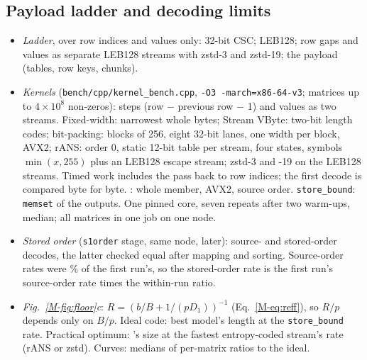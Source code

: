 \subsection{Payload ladder and decoding limits}
\label{sec:mkernels}
\begin{itemize}\itemsep 1pt
\item \emph{Ladder}, over row indices and values only: 32-bit CSC; LEB128; row gaps and values as separate LEB128 streams
  with zstd-3 and zstd-19; the \sone{} payload (tables, row keys, chunks).
\item \emph{Kernels} (\texttt{bench/cpp/kernel\_bench.cpp}, \texttt{-O3 -march=x86-64-v3};  matrices up to
  $4\times10^8$ non-zeros): steps (row $-$ previous row $-$ 1) and values as two streams. Fixed-width: narrowest whole
  bytes; Stream VByte: two-bit length codes; bit-packing: blocks of 256, eight 32-bit lanes, one width per block, AVX2;
  rANS: order 0, static 12-bit table per stream, four states, symbols $\min(x,255)$ plus an LEB128 escape stream; zstd-3
  and -19 on the LEB128 streams. Timed work includes the pass back to row indices; the first decode is compared byte for
  byte. \sone{}: whole member, AVX2, source order. \texttt{store\_bound}: \texttt{memset} of the outputs. One pinned core,
  seven repeats after two warm-ups, median; all matrices in one job on one node.
\item \emph{Stored order} (\texttt{s1order} stage, same node, later): source- and stored-order decodes, the latter
  checked equal after mapping and sorting. Source-order rates were \% of the first run's, so the
  stored-order rate is the first run's source-order rate times the within-run ratio.
\item \emph{Fig.~\ref{M-fig:floor}c}: $R=(b/B+1/(pD_1))^{-1}$ (Eq.~\ref{M-eq:reff}), so $R/p$ depends only on $B/p$.
  Ideal code: best model's length at the \texttt{store\_bound} rate. Practical optimum: \sone's size at the fastest
  entropy-coded stream's rate (rANS or zstd). Curves: medians of per-matrix ratios to the ideal.
\end{itemize}

